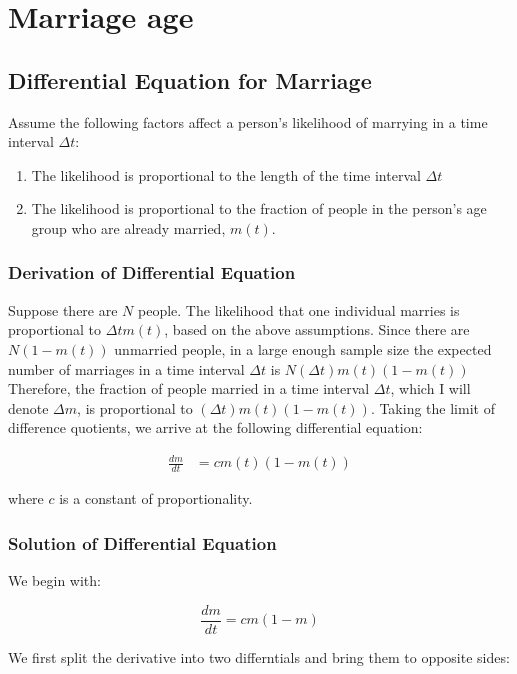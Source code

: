 \documentclass{article}
\begin{document}
\section{Marriage age}

\subsection{Differential Equation for Marriage}

Assume the following factors affect a person's likelihood of
	marrying in a time interval $\Delta t$:

\begin{enumerate}
	\item The likelihood is proportional to the length of 
			the time interval $\Delta t$
	\item The likelihood is proportional to the fraction of 
			people in the person's age group
			who are already married, $m(t)$.
\end{enumerate}

\subsubsection{Derivation of Differential Equation}

Suppose there are $N$ people.
The likelihood that one individual marries is proportional to
	$\Delta t m(t)$, based on the above assumptions.
Since there are $N (1 - m(t))$ unmarried people, in a large enough
	sample size the expected number of marriages in a time interval
	$\Delta t$ is $N (\Delta t) m(t) (1 - m(t))$
Therefore, the fraction of people married in a time interval $\Delta t$,
	which I will denote $\Delta m$, is proportional to 
	$(\Delta t) m(t) (1 - m(t))$.
Taking the limit of difference quotients, we arrive at the following
	differential equation:

\begin{align}
		\frac{dm}{dt} & = c m(t) \left( 1 - m(t) \right)
\end{align}

where $c$ is a constant of proportionality.

\subsubsection{Solution of Differential Equation}

We begin with:

\[ \frac{dm}{dt} = c m (1-m) \]

We first split the derivative into two differntials and bring them
	to opposite sides:
\end{document}
